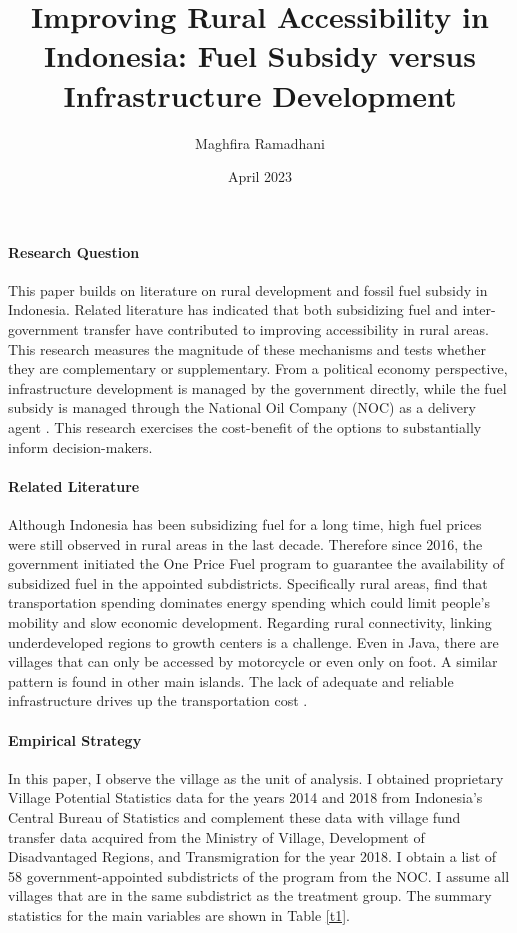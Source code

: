 \documentclass[letterpaper,11pt,leqno]{article}
\begin{document}
\title{Improving Rural Accessibility in Indonesia: Fuel Subsidy versus Infrastructure Development}
\author{Maghfira Ramadhani}
\date{April 2023}       
\maketitle
 
\paragraph{Research Question} This paper builds on literature on rural development and fossil fuel subsidy in Indonesia. Related literature has indicated that both subsidizing fuel and inter-government transfer have contributed to improving accessibility in rural areas. This research measures the magnitude of these mechanisms and tests whether they are complementary or supplementary. From a political economy perspective, infrastructure development is managed by the government directly, while the fuel subsidy is managed through the National Oil Company (NOC) as a delivery agent \citep{ichsan_2022}. This research exercises the cost-benefit of the options to substantially inform decision-makers.

\paragraph{Related Literature} Although Indonesia has been subsidizing fuel for a long time, high fuel prices were still observed in rural areas in the last decade. Therefore since 2016, the government initiated the One Price Fuel program to guarantee the availability of subsidized fuel in the appointed subdistricts. Specifically rural areas, \citet{sambodo_2019} find that transportation spending dominates energy spending which could limit people's mobility and slow economic development. Regarding rural connectivity, linking underdeveloped regions to growth centers is a challenge. Even in Java, there are villages that can only be accessed by motorcycle or even only on foot. A similar pattern is found in other main islands. The lack of adequate and reliable infrastructure drives up the transportation cost \citep{sandee_2016}.


\paragraph{Empirical Strategy} In this paper, I observe the village as the unit of analysis. I obtained proprietary Village Potential Statistics data for the years 2014 and 2018 from Indonesia's Central Bureau of Statistics and complement these data with village fund transfer data acquired from the Ministry of Village, Development of Disadvantaged Regions, and Transmigration for the year 2018. I obtain a list of 58 government-appointed subdistricts of the program from the NOC. I assume all villages that are in the same subdistrict as the treatment group. The summary statistics for the main variables are shown in Table \ref{t1}.
\end{document}
